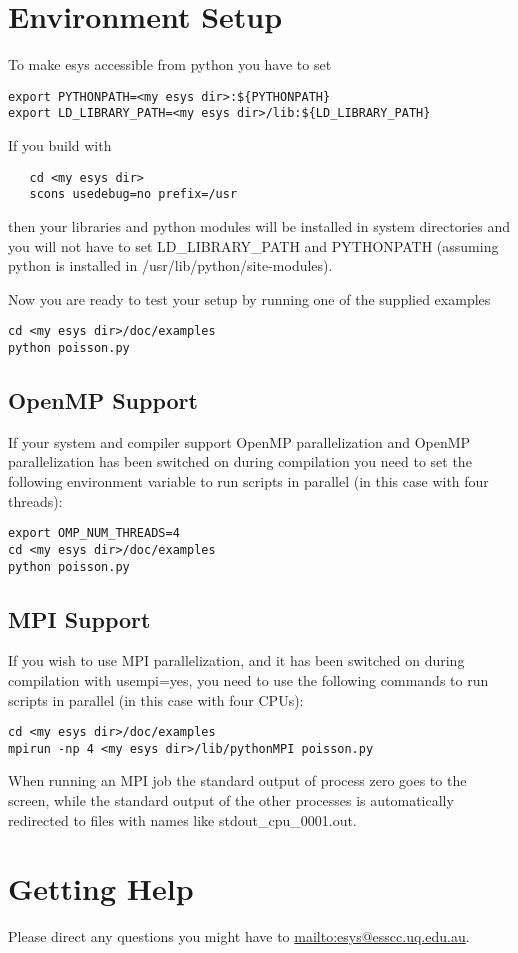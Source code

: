 \section{Environment Setup}
To make esys accessible from python you have to set
\begin{verbatim}
export PYTHONPATH=<my esys dir>:${PYTHONPATH}
export LD_LIBRARY_PATH=<my esys dir>/lib:${LD_LIBRARY_PATH}
\end{verbatim}

If you build \esys with
\begin{verbatim}
   cd <my esys dir>
   scons usedebug=no prefix=/usr
\end{verbatim}
then your libraries and python modules will be installed in system directories and you will
not have to set LD_LIBRARY_PATH and PYTHONPATH (assuming python is installed in
/usr/lib/python/site-modules).

Now you are ready to test your setup by running one of the supplied examples
\begin{verbatim}
cd <my esys dir>/doc/examples
python poisson.py
\end{verbatim}

\subsection{OpenMP Support}

If your system and compiler support OpenMP parallelization and OpenMP parallelization has been switched on during compilation you need to set the following environment variable to run scripts in parallel (in this case with four threads):
\begin{verbatim}
export OMP_NUM_THREADS=4
cd <my esys dir>/doc/examples
python poisson.py
\end{verbatim}

\subsection{MPI Support}

If you wish to use MPI parallelization, and it has been switched on during compilation with usempi=yes, you need to use the following commands to run scripts in parallel (in this case with four CPUs):
\begin{verbatim}
cd <my esys dir>/doc/examples
mpirun -np 4 <my esys dir>/lib/pythonMPI poisson.py
\end{verbatim}

When running an MPI job the standard output of process zero goes to the screen, while the standard output of the other processes
is automatically redirected to files with names like stdout_cpu_0001.out.

\section{Getting Help}
Please direct any questions you might have to \url{mailto:esys@esscc.uq.edu.au}.
